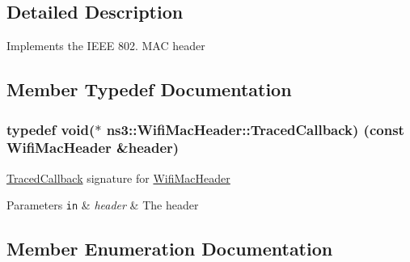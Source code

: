 \subsection{Detailed Description}
Implements the I\+E\+EE 802. M\+AC header 

\subsection{Member Typedef Documentation}
\subsubsection[{\texorpdfstring{Traced\+Callback}{TracedCallback}}]{\setlength{\rightskip}{0pt plus 5cm}typedef void($\ast$  ns3\+::\+Wifi\+Mac\+Header\+::\+Traced\+Callback) (const {\bf Wifi\+Mac\+Header} \&header)}\hypertarget{classns3_1_1WifiMacHeader_a62123d116be8a1ba54d2fdeeeb873570}{}\label{classns3_1_1WifiMacHeader_a62123d116be8a1ba54d2fdeeeb873570}
\hyperlink{classns3_1_1TracedCallback}{Traced\+Callback} signature for \hyperlink{classns3_1_1WifiMacHeader}{Wifi\+Mac\+Header}


\begin{DoxyParams}[1]{Parameters}
\mbox{\tt in}  & {\em header} & The header \\
\hline
\end{DoxyParams}


\subsection{Member Enumeration Documentation}
